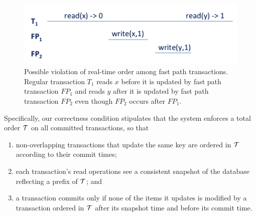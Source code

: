 \begin{figure}[ht]
\includegraphics[width=\columnwidth]{figs/FP-semantics}
\caption{Possible violation of real-time order among fast path transactions. Regular transaction $T_1$
reads $x$ before it is updated by fast path transaction $FP_1$ and reads $y$ after it is updated by fast path transaction $FP_2$ even 
though $FP_2$ occurs after $FP_1$. 
}
\label{fig:ltx-rt}
\end{figure}

Specifically, our correctness condition stipulates that
the system enforces a total order ${\cal T}$ on all committed transactions, so that
\begin{enumerate}
    \setlength{\itemsep}{0pt}
    \setlength{\parskip}{0pt}
    \setlength{\parsep}{2pt}  
\item
non-overlapping transactions 
that update the same key are ordered in ${\cal T}$  according to their commit times;
\item
each  transaction's read operations see a consistent snapshot of the database reflecting 
a prefix of  ${\cal T}$; and  
\item
 a transaction commits only if none of the items it updates is modified by a transaction ordered in ${\cal T}$ after
 its snapshot time and before its commit time.
 \end{enumerate}

 
